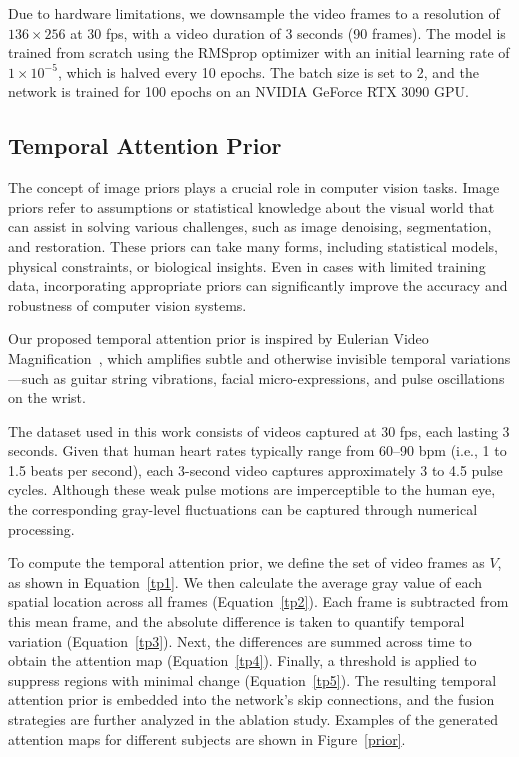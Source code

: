 \documentclass[twocolumn]{article}
\begin{document}
Due to hardware limitations, we downsample the video frames to a resolution of $136 \times 256$ at 30 fps, with a video duration of 3 seconds (90 frames). The model is trained from scratch using the RMSprop optimizer with an initial learning rate of $1 \times 10^{-5}$, which is halved every 10 epochs. The batch size is set to 2, and the network is trained for 100 epochs on an NVIDIA GeForce RTX 3090 GPU.

\subsection{Temporal Attention Prior}
\label{temporal_attention}
The concept of image priors plays a crucial role in computer vision tasks. Image priors refer to assumptions or statistical knowledge about the visual world that can assist in solving various challenges, such as image denoising, segmentation, and restoration. These priors can take many forms, including statistical models, physical constraints, or biological insights. Even in cases with limited training data, incorporating appropriate priors can significantly improve the accuracy and robustness of computer vision systems.

Our proposed temporal attention prior is inspired by Eulerian Video Magnification~\cite{wu2012, wadhwa2013}, which amplifies subtle and otherwise invisible temporal variations—such as guitar string vibrations, facial micro-expressions, and pulse oscillations on the wrist.

The dataset used in this work consists of videos captured at 30 fps, each lasting 3 seconds. Given that human heart rates typically range from 60–90 bpm (i.e., 1 to 1.5 beats per second), each 3-second video captures approximately 3 to 4.5 pulse cycles. Although these weak pulse motions are imperceptible to the human eye, the corresponding gray-level fluctuations can be captured through numerical processing.

To compute the temporal attention prior, we define the set of video frames as $V$, as shown in Equation~\ref{tp1}. We then calculate the average gray value of each spatial location across all frames (Equation~\ref{tp2}). Each frame is subtracted from this mean frame, and the absolute difference is taken to quantify temporal variation (Equation~\ref{tp3}). Next, the differences are summed across time to obtain the attention map (Equation~\ref{tp4}). Finally, a threshold is applied to suppress regions with minimal change (Equation~\ref{tp5}). The resulting temporal attention prior is embedded into the network’s skip connections, and the fusion strategies are further analyzed in the ablation study. Examples of the generated attention maps for different subjects are shown in Figure~\ref{prior}.
\end{document}

